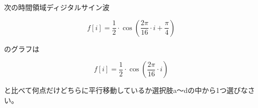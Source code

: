 次の時間領域ディジタルサイン波 

\[
f[i] = \frac{1}{2} \cdot \cos \left ( \frac{2 \pi}{16}  \cdot i + \frac{\pi}{4} \right )
\]

\noindent のグラフは

\[
f[i] = \frac{1}{2} \cdot \cos \left ( \frac{2 \pi}{16}  \cdot i \right )
\]

\noindent と比べて何点だけどちらに平行移動しているか選択肢a〜dの中から1つ選びなさい。
